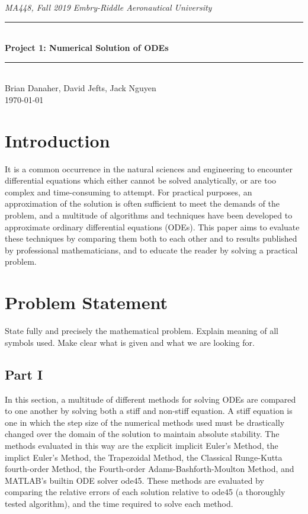 \documentclass[11pt]{article}
\newcommand{\horrule}[1]{\rule{\linewidth}{#1}}      %
\begin{document}
\begin{center}
{\it MA448, Fall 2019  \hfill Embry-Riddle Aeronautical University
 }\\
\horrule{0.5pt} \\[0.4cm]
{\bf \Large  %
Project 1: Numerical Solution of ODEs
}\\
\horrule{2pt} \\[5cm]
Brian Danaher, David Jefts, Jack Nguyen
\\[0.4cm]
\today %
\end{center}
\thispagestyle{empty}
\newpage
\begin{abstract}
\end{abstract}
\tableofcontents 
\newpage
\section{Introduction}\label{S:1}
It is a common occurrence in the natural sciences and engineering to encounter
differential equations which either cannot be solved analytically, or are too 
complex and time-consuming to attempt. For practical purposes, an approximation
of the solution is often sufficient to meet the demands of the problem, and a
multitude of algorithms and techniques have been developed to approximate 
ordinary differential equations (ODEs). This paper aims to evaluate these techniques by 
comparing them both to each other and to results published by professional mathematicians, 
and to educate the reader by solving a practical problem.
\section{Problem Statement}\label{S:2}
State fully and precisely the mathematical problem.  
Explain meaning of all symbols used. Make clear what is given and what we are 
looking for. 
\subsection{Part I}\label{S:2.1}
%
In this section, a multitude of different methods for solving ODEs are compared 
to one another by solving both a stiff and non-stiff equation. A stiff equation
is one in which the step size of the numerical methods used must be drastically
changed over the domain of the solution to maintain absolute stability. The 
methods evaluated in this way are the explicit implicit Euler's Method, the
implict Euler's Method, the Trapezoidal Method, the Classical Runge-Kutta 
fourth-order Method, the Fourth-order Adams-Bashforth-Moulton Method, and MATLAB's
builtin ODE solver ode45. These methods are evaluated by comparing the relative
errors of each solution relative to ode45 (a thoroughly tested algorithm), and 
the time required to solve each method.
\end{document}
